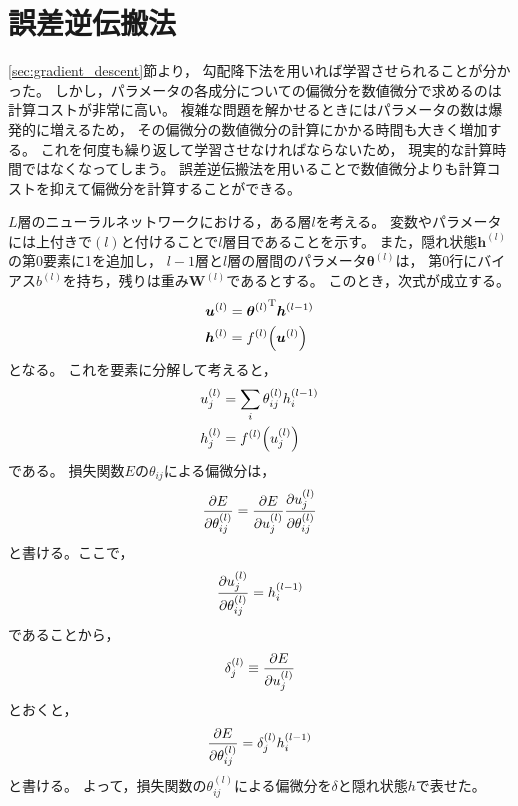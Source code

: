 \documentclass[class=jsarticle, crop=false, dvipdfmx, fleqn]{standalone}
\begin{document}
\section{誤差逆伝搬法}

\ref{sec:gradient_descent}節より，
勾配降下法を用いれば学習させられることが分かった。
しかし，パラメータの各成分についての偏微分を数値微分で求めるのは計算コストが非常に高い。
複雑な問題を解かせるときにはパラメータの数は爆発的に増えるため，
その偏微分の数値微分の計算にかかる時間も大きく増加する。
これを何度も繰り返して学習させなければならないため，
現実的な計算時間ではなくなってしまう。
誤差逆伝搬法を用いることで数値微分よりも計算コストを抑えて偏微分を計算することができる。

$L$層のニューラルネットワークにおける，ある層$l$を考える。
変数やパラメータには上付きで$(l)$と付けることで$l$層目であることを示す。
また，隠れ状態$\bm{h}^{(l)}$の第0要素に1を追加し，
$l-1$層と$l$層の層間のパラメータ$\bm{\theta}^{(l)}$は，
第0行にバイアス$b^{(l)}$を持ち，残りは重み$\bm{W}^{(l)}$であるとする。
このとき，次式が成立する。
\begin{align}
& \bm{u}^{(l)} = {\bm{\theta}^{(l)}}^{\mathrm{T}} \bm{h}^{(l-1)} \\
& \bm{h}^{(l)} = f^{(l)} \qty(\bm{u}^{(l)})
\end{align}
となる。
これを要素に分解して考えると，
\begin{align}
& u_j^{(l)} = \sum_i \theta_{ij}^{(l)} h_i^{(l-1)} \\
& h_j^{(l)} = f^{(l)} \qty(u_j^{(l)})
\end{align}
である。
損失関数$E$の$\theta_{ij}$による偏微分は，
\begin{equation}
\pdv{E}{\theta_{ij}^{(l)}} = \pdv{E}{u_j^{(l)}} \pdv{u_j^{(l)}}{\theta_{ij}^{(l)}}
\end{equation}
と書ける。ここで，
\begin{equation}
\pdv{u_j^{(l)}}{\theta_{ij}^{(l)}} = h_i^{(l-1)}
\end{equation}
であることから，
\begin{equation}
\delta_j^{(l)} \equiv \pdv{E}{u_j^{(l)}}
\label{eq:def:delta}
\end{equation}
とおくと，
\begin{equation}
\pdv{E}{\theta_{ij}^{(l)}} = \delta_j^{(l)} h_i^{(l-1)}
\label{eq:pdv_param}
\end{equation}
と書ける。
よって，損失関数の$\theta_{ij}^{(l)}$による偏微分を$\delta$と隠れ状態$h$で表せた。
\end{document}
